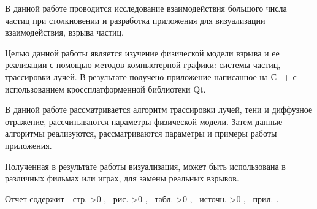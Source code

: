 \Referat

\hfill

В данной работе проводится исследование взаимодействия большого числа частиц при столкновении и разработка приложения для визуализации взаимодействия, взрыва частиц. 

Целью данной работы является изучение физической модели взрыва и ее реализации с помощью методов компьютерной графики: системы частиц, трассировки лучей. В результате получено приложение написанное на С++ с использованием кроссплатформенной библиотеки Qt. 

В данной работе рассматривается алгоритм трассировки лучей, тени и диффузное отражение, рассчитываются параметры физической модели. Затем данные алгоритмы реализуются, рассматриваются параметры и примеры работы приложения. 

Полученная в результате работы визуализация, может быть использована в различных фильмах или играх, для замены реальных взрывов. 

Отчет содержит \pageref{LastPage}\,~стр.%
    \ifnum \totfig >0
    , \totfig~рис.%
    \fi
    \ifnum \tottab >0
    , \tottab~табл.%
    \fi
    \ifnum \totbib >0
    , \totbib~источн.%
    \fi
    \ifnum \totapp >0
    , \totapp~прил.%
    \else
    .%
    \fi

